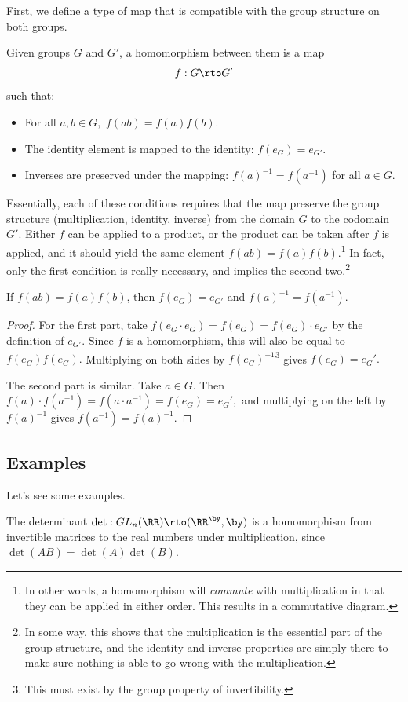 First, we define a type of map that is compatible with the group structure on both groups.

\begin{definition}
Given groups $G$ and $G'$, a homomorphism between them is a map 
\[
f: G \rto G'
\]
such that:
\begin{itemize}
    \item For all $a, b \in G,$ $f(ab) = f(a)f(b)$.
    \item The identity element is mapped to the identity: $f(e_G) = e_{G'}.$
    \item Inverses are preserved under the mapping: $f(a)^{-1}=f(a^{-1})$ for all $a \in G.$
\end{itemize}
\end{definition}

Essentially, each of these conditions requires that the map preserve the group structure (multiplication, identity, inverse) from the domain $G$ to the codomain $G'$. Either $f$ can be applied to a product, or the product can be taken after $f$ is applied, and it should yield the same element $f(ab) = f(a)f(b).$\footnote{In other words, a homomorphism will \emph{commute} with multiplication in that they can be applied in either order. This results in a commutative diagram.} In fact, only the first condition is really necessary, and implies the second two.\footnote{In some way, this shows that the multiplication is the essential part of the group structure, and the identity and inverse properties are simply there to make sure nothing is able to go wrong with the multiplication.}

\begin{proposition}
If $f(ab) = f(a)f(b)$, then $f(e_G) = e_{G'}$ and $f(a)^{-1} = f(a^{-1})$. 
\end{proposition}
\begin{proof}
For the first part, take $f(e_G \cdot e_G) = f(e_G) = f(e_G) \cdot e_{G'}$ by the definition of $e_{G'}.$ Since $f$ is a homomorphism, this will also be equal to $f(e_G)f(e_G).$ Multiplying on both sides by $f(e_G)^{-1}$\footnote{This must exist by the group property of invertibility.} gives $f(e_G) = e_G'.$

The second part is similar. Take $a \in G.$ Then $f(a)\cdot f(a^{-1}) = f(a \cdot a^{-1}) = f(e_G) = e_G',$ and multiplying on the left by $f(a)^{-1}$ gives $f(a^{-1}) = f(a)^{-1}.$
\end{proof}

\subsection{Examples}
Let's see some examples.
\begin{example}
The determinant $\text{det}: GL_n(\RR) \rto (\RR^{\by}, \by)$ is a homomorphism from invertible matrices to the real numbers under multiplication, since $\det(AB) = \det(A)\det(B).$ 
\end{example}

